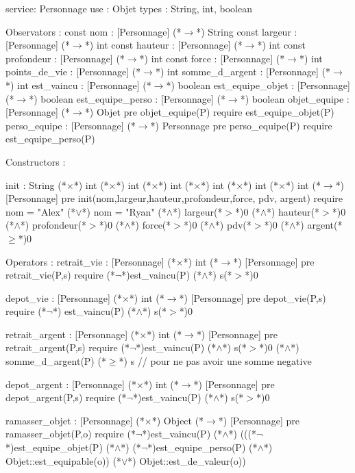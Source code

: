\documentclass[a4paper, 11pt]{report}
\begin{document}
\begin{Spe}
service: Personnage
use : Objet
types : String, int, boolean

Observators : 
	const nom : [Personnage] (*$\rightarrow$*) String
	const largeur : [Personnage] (*$\rightarrow$*) int
	const hauteur : [Personnage] (*$\rightarrow$*) int
	const profondeur : [Personnage] (*$\rightarrow$*) int
	const force : [Personnage] (*$\rightarrow$*) int 
	points_de_vie : [Personnage] (*$\rightarrow$*) int
	somme_d_argent : [Personnage] (*$\rightarrow$*) int 
	est_vaincu : [Personnage] (*$\rightarrow$*) boolean 
	est_equipe_objet : [Personnage] (*$\rightarrow$*) boolean
	est_equipe_perso : [Personnage] (*$\rightarrow$*) boolean 
	objet_equipe : [Personnage] (*$\rightarrow$*) Objet
		pre objet_equipe(P) require est_equipe_objet(P)
	perso_equipe : [Personnage] (*$\rightarrow$*) Personnage
		pre perso_equipe(P) require est_equipe_perso(P) 

Constructors : 

	init : String (*$\times$*) int (*$\times$*) int (*$\times$*) int (*$\times$*) int (*$\times$*) int (*$\times$*) int (*$\rightarrow$*) [Personnage]
		pre init(nom,largeur,hauteur,profondeur,force, pdv, argent) require nom = "Alex" (*$\lor$*) nom = "Ryan" (*$\land$*) largeur(*$>$*)0 (*$\land$*) hauteur(*$>$*)0 (*$\land$*) profondeur(*$>$*)0 (*$\land$*) force(*$>$*)0 (*$\land$*) pdv(*$>$*)0 (*$\land$*) argent(*$\ge$*)0 

Operators :
	retrait_vie :  [Personnage] (*$\times$*) int (*$\rightarrow$*) [Personnage]
		pre retrait_vie(P,s) require (*$\lnot$*)est_vaincu(P) (*$\land$*) s(*$>$*)0
		
	depot_vie : [Personnage] (*$\times$*) int (*$\rightarrow$*) [Personnage]
		pre depot_vie(P,s) require (*$\lnot$*) est_vaincu(P) (*$\land$*) s(*$>$*)0
		
	retrait_argent :  [Personnage] (*$\times$*) int (*$\rightarrow$*) [Personnage]
		pre retrait_argent(P,s) require (*$\lnot$*)est_vaincu(P) (*$\land$*) s(*$>$*)0 (*$\land$*) somme_d_argent(P) (*$\ge$*) s // pour ne pas avoir une somme negative
		
	depot_argent : [Personnage] (*$\times$*) int (*$\rightarrow$*) [Personnage]
		pre depot_argent(P,s) require (*$\lnot$*)est_vaincu(P) (*$\land$*) s(*$>$*)0
		
	ramasser_objet : [Personnage] (*$\times$*) Object (*$\rightarrow$*) [Personnage]
		pre ramasser_objet(P,o) require (*$\lnot$*)est_vaincu(P) (*$\land$*) (((*$\lnot$*)est_equipe_objet(P) (*$\land$*)  (*$\lnot$*)est_equipe_perso(P) (*$\land$*) Objet::est_equipable(o)) (*$\lor$*) Objet::est_de_valeur(o))
		

\end{Spe}
\end{document}
